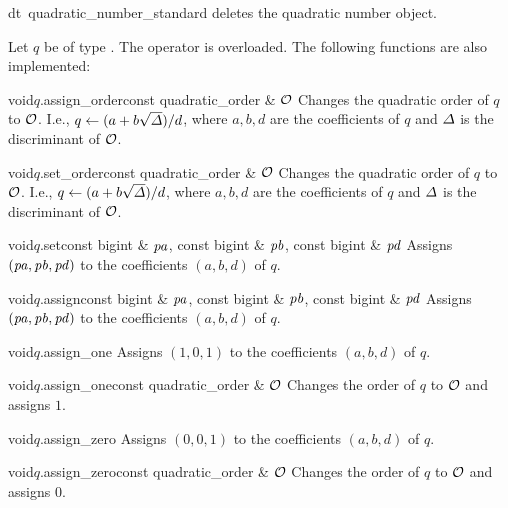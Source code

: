 \begin{fcode}{dt}{~quadratic_number_standard}{}
  deletes the quadratic number object.
\end{fcode}



\ASGN

Let $q$ be of type .  The operator \code{=} is overloaded.  The
following functions are also implemented:

\begin{fcode}{void}{$q$.assign_order}{const quadratic_order & $\mathcal{O}$}
  Changes the quadratic order of $q$ to $\mathcal{O}$.  I.e., $q \leftarrow (a + b \sqrt{\varDelta})/d$, where
  $a,b,d$ are the coefficients of $q$ and $\varDelta$ is the discriminant of $\mathcal{O}$.
\end{fcode}

\begin{fcode}{void}{$q$.set_order}{const quadratic_order & $\mathcal{O}$}
  Changes the quadratic order of $q$ to $\mathcal{O}$.  I.e., $q \leftarrow (a + b \sqrt{\varDelta})/d$, where
  $a,b,d$ are the coefficients of $q$ and $\varDelta$ is the discriminant of $\mathcal{O}$.
\end{fcode}

\begin{fcode}{void}{$q$.set}{const bigint & $\mathit{pa}$, const bigint & $\mathit{pb}$, const bigint & $\mathit{pd}$}
  Assigns $(\mathit{pa},\mathit{pb},\mathit{pd})$ to the coefficients $(a,b,d)$ of $q$.
\end{fcode}

\begin{fcode}{void}{$q$.assign}{const bigint & $\mathit{pa}$, const bigint & $\mathit{pb}$, const bigint & $\mathit{pd}$}
  Assigns $(\mathit{pa},\mathit{pb},\mathit{pd})$ to the coefficients $(a,b,d)$ of $q$.
\end{fcode}

\begin{fcode}{void}{$q$.assign_one}{}
  Assigns $(1,0,1)$ to the coefficients $(a,b,d)$ of $q$.
\end{fcode}

\begin{fcode}{void}{$q$.assign_one}{const quadratic_order & $\mathcal{O}$}
  Changes the order of $q$ to $\mathcal{O}$ and assigns $1$.
\end{fcode}

\begin{fcode}{void}{$q$.assign_zero}{}
  Assigns $(0,0,1)$ to the coefficients $(a,b,d)$ of $q$.
\end{fcode}

\begin{fcode}{void}{$q$.assign_zero}{const quadratic_order & $\mathcal{O}$}
  Changes the order of $q$ to $\mathcal{O}$ and assigns $0$.
\end{fcode}

